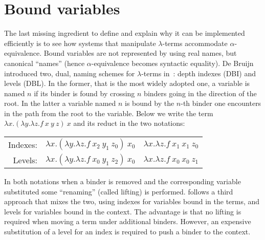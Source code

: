 \documentclass{llncs}
\begin{document}
\section{Bound variables}
\label{sec:dbl}

The last missing ingredient to define \rff{} and explain why it can be
implemented efficiently is to see how systems that manipulate $\lambda$-terms
accommodate
$\alpha$-equivalence. Bound variables are not represented by using
real names, but canonical ``names'' (hence $\alpha$-equivalence becomes syntactic equality).
De Bruijn introduced two, dual, naming schemes for $\lambda$-terms in~\cite{debruijnlevel}:
depth indexes (DBI) and levels
(DBL). In the former, that is the most widely adopted one, a variable is named $n$ if its binder is found by
crossing $n$ binders going in the direction of the root. In the latter a
variable named $n$ is bound by the $n$-th binder one encounters in the path
from the root to the variable.
Below we write the term $\lambda x.(\lambda y.\lambda z.f~x~y~z)~x$ and its reduct in the two notations:
\vspace{-0.5em}
\begin{center}
\begin{tabular}{r@{~~}c@{~$\to_\beta$~}c}
Indexes: & $\lambda x.(\lambda y.\lambda z.f~x_2~y_1~z_0)~x_0$ &
$\lambda x.\lambda z.f~x_1~x_1~z_0$ \\
Levels: & $\lambda x.(\lambda y.\lambda z.f~x_0~y_1~z_2)~x_0$ &
$\lambda x.\lambda z.f~x_0~x_0~z_1$ \\
\end{tabular}
\end{center}
\vspace{-0.5em}
In both notations when a binder is removed and the corresponding variable
substituted some ``renaming'' (called lifting) is performed.
\tedius{} follows
a third approach that mixes the two, using indexes for variables bound in
the terms, and levels for variables bound in the context. The advantage
is that no lifting is required when moving a term under additional binders.
However, an expensive substitution of a level for an index is
required to push a binder to the context.
\end{document}
